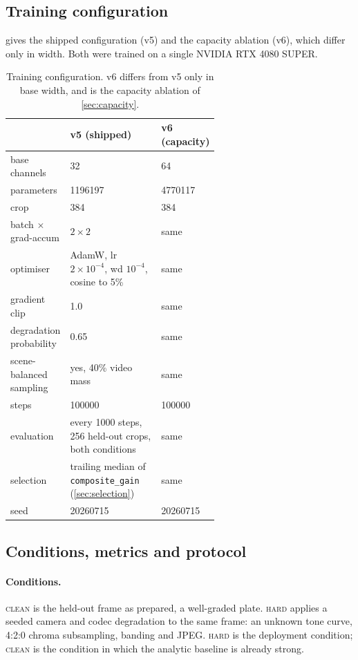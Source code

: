 \subsection{Training configuration}
\label{sec:training}

 gives the shipped configuration (v5) and the capacity
ablation (v6), which differ only in width. Both were trained on a single NVIDIA
RTX 4080 SUPER.

\begin{table}[htbp]
\centering
\caption{Training configuration. v6 differs from v5 only in base width, and is
the capacity ablation of \cref{sec:capacity}.}
\label{tab:training}
\begin{tabular}{lp{0.44\linewidth}p{0.16\linewidth}}
\toprule
 & v5 (shipped) & v6 (capacity) \\
\midrule
base channels & 32 & 64 \\
parameters & \num{1196197} & \num{4770117} \\
crop & 384 & 384 \\
batch $\times$ grad-accum & $2 \times 2$ & same \\
optimiser & AdamW, lr $2\!\times\!10^{-4}$, wd $10^{-4}$, cosine to 5\% & same \\
gradient clip & 1.0 & same \\
degradation probability & 0.65 & same \\
scene-balanced sampling & yes, 40\% video mass & same \\
steps & \num{100000} & \num{100000} \\
evaluation & every \num{1000} steps, 256 held-out crops, both conditions & same \\
selection & trailing median of \texttt{composite\_gain} (\cref{sec:selection}) & same \\
seed & \num{20260715} & \num{20260715} \\
\bottomrule
\end{tabular}
\end{table}

\subsection{Conditions, metrics and protocol}
\label{sec:protocol}

\paragraph{Conditions.} \textsc{clean} is the held-out frame as prepared, a
well-graded plate. \textsc{hard} applies a seeded camera and codec degradation
to the same frame: an unknown tone curve, 4:2:0 chroma subsampling, banding and
JPEG. \textsc{hard} is the deployment condition; \textsc{clean} is the condition
in which the analytic baseline is already strong.

